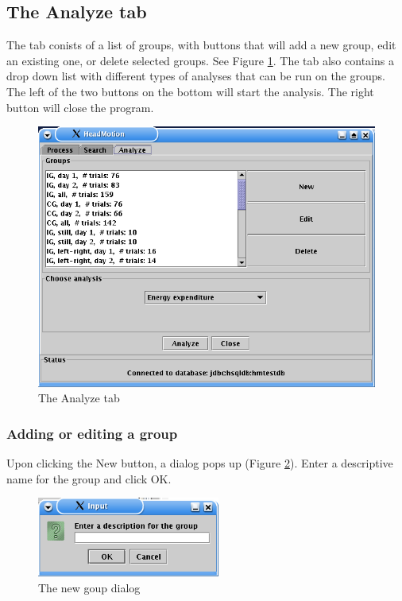 \documentclass[a4paper,11pt]{article}
\begin{document}
\subsection{The Analyze tab}
The tab conists of a list of groups, with buttons that will add a new
group, edit an existing one, or delete selected groups. See Figure
\ref{fig:analyzegui}. The tab also contains a drop down list with
different types of analyses that can be run on the groups. The left of
the two buttons on the bottom will start the analysis. The right
button will close the program.
  \begin{figure}[htbp]
    \centering
    \includegraphics[width=120mm]{figures/analyzegui.png}
    \caption{The Analyze tab}
    \label{fig:analyzegui}
  \end{figure}

\subsubsection{Adding or editing a group}
Upon clicking the New button, a dialog pops up (Figure
\ref{fig:groupdescription}). Enter a descriptive name for the group
and click OK. 
  \begin{figure}[htbp]
    \centering
    \includegraphics[width=60mm]{figures/groupdescription.png}
    \caption{The new goup dialog}
    \label{fig:groupdescription}
  \end{figure}
\end{document}
